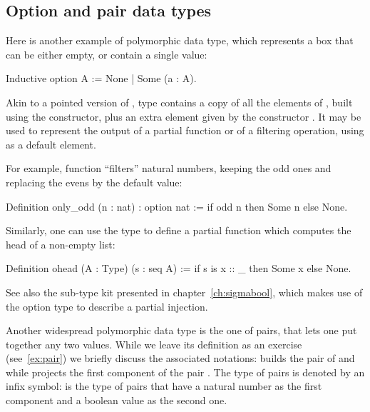 \subsection{Option and pair data types}\label{sec:othercontainers}

Here is another example of polymorphic data type, which represents a
box that can be either empty, or contain a single value:

\begin{coq}{}{}
Inductive option A := None | Some (a : A).
\end{coq}

Akin to a pointed version of , type   contains a
copy of all the elements of ,
built using the  constructor, plus an extra element given by
the constructor . It may be used to represent the output of a
partial function or of a filtering operation, using  as a
default element.

For example, function  ``filters'' natural numbers, keeping the
odd ones and replacing the evens by the  default value:

\begin{coq}{}{}
Definition only_odd (n : nat) : option nat :=
  if odd n then Some n else None.
\end{coq}

Similarly, one can use the  type to define a partial function
which computes the head of a non-empty list:

\begin{coq}{}{}
Definition ohead (A : Type) (s : seq A) :=
  if s is x :: _ then Some x else None.
\end{coq}

See also the sub-type kit presented in chapter~\ref{ch:sigmabool},
which makes use of the option type to describe a partial injection.


Another widespread polymorphic data type is the one of pairs, that
lets one put together any two values.  While we leave its definition
as an exercise (see~\ref{ex:pair}) we briefly discuss the associated
notations:  builds the pair of  and  while 
projects the first component of the pair .  The type of pairs is
denoted by an infix \C{*} symbol:  is the type of
pairs that have a natural number as the first component and a boolean
value as the second one.

